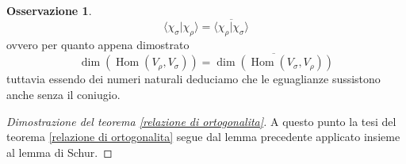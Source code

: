 \documentclass[11pt]{article}
\theoremstyle{plain}
\theoremstyle{definition}
\newtheorem*{rem}{Osservazione}
\theoremstyle{remark}
\DeclareMathOperator{\Hom}{Hom}
\begin{document}
\begin{rem}
\[\langle \chi_\sigma | \chi_\rho \rangle=\overline{\langle \chi_\rho | \chi_\sigma \rangle}\]
ovvero per quanto appena dimostrato
\[ \dim(\Hom(V_\rho, V_\sigma))=\overline{\dim(\Hom(V_\sigma, V_\rho))}\]
tuttavia essendo dei numeri naturali deduciamo che le eguaglianze sussistono anche senza il coniugio.
\end{rem}











\begin{proof}[Dimostrazione del teorema \ref{relazione di ortogonalita}]

A questo punto la tesi del teorema \ref{relazione di ortogonalita} segue dal lemma precedente applicato insieme al lemma di Schur.
\end{proof}
\end{document}
